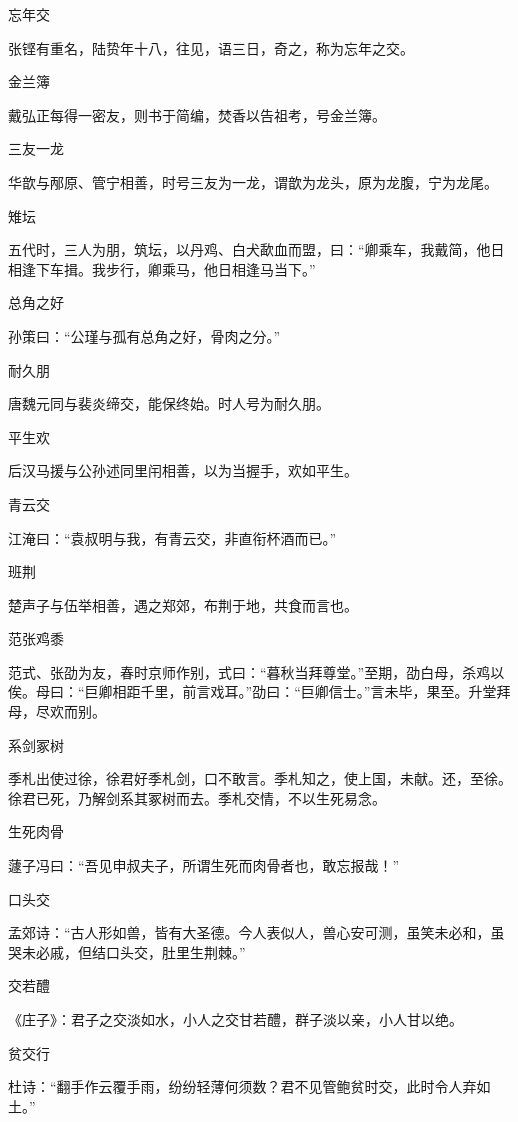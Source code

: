 \documentclass[a4paper,12pt,UTF8,twoside]{ctexbook}
\begin{document}
    忘年交
    
    张铿有重名，陆贽年十八，往见，语三日，奇之，称为忘年之交。
    
    金兰簿
    
    戴弘正每得一密友，则书于简编，焚香以告祖考，号金兰簿。
    
    三友一龙
    
    华歆与邴原、管宁相善，时号三友为一龙，谓歆为龙头，原为龙腹，宁为龙尾。
    
    雉坛
    
    五代时，三人为朋，筑坛，以丹鸡、白犬歃血而盟，曰：“卿乘车，我戴简，他日相逢下车揖。我步行，卿乘马，他日相逢马当下。”
    
    总角之好
    
    孙策曰：“公瑾与孤有总角之好，骨肉之分。”
    
    耐久朋
    
    唐魏元同与裴炎缔交，能保终始。时人号为耐久朋。
    
    平生欢
    
    后汉马援与公孙述同里闬相善，以为当握手，欢如平生。
    
    青云交
    
    江淹曰：“袁叔明与我，有青云交，非直衔杯酒而已。”
    
    班荆
    
    楚声子与伍举相善，遇之郑郊，布荆于地，共食而言也。
    
    范张鸡黍
    
    范式、张劭为友，春时京师作别，式曰：“暮秋当拜尊堂。”至期，劭白母，杀鸡以俟。母曰：“巨卿相距千里，前言戏耳。”劭曰：“巨卿信士。”言未毕，果至。升堂拜母，尽欢而别。
    
    系剑冢树
    
    季札出使过徐，徐君好季札剑，口不敢言。季札知之，使上国，未献。还，至徐。徐君已死，乃解剑系其冢树而去。季札交情，不以生死易念。
    
    生死肉骨
    
    蘧子冯曰：“吾见申叔夫子，所谓生死而肉骨者也，敢忘报哉！”
    
    口头交
    
    孟郊诗：“古人形如兽，皆有大圣德。今人表似人，兽心安可测，虽笑未必和，虽哭未必戚，但结口头交，肚里生荆棘。”
    
    交若醴
    
    《庄子》：君子之交淡如水，小人之交甘若醴，群子淡以亲，小人甘以绝。
    
    贫交行
    
    杜诗：“翻手作云覆手雨，纷纷轻薄何须数？君不见管鲍贫时交，此时令人弃如土。”
    
\end{document}
